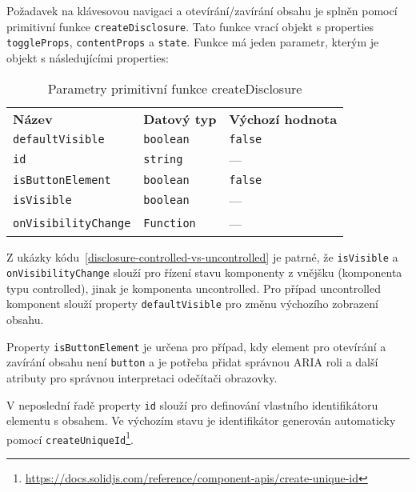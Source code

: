 Požadavek na klávesovou navigaci \hyperref[ofr11]{} a otevírání/zavírání obsahu \hyperref[dfr11]{} je splněn pomocí primitivní funkce \texttt{createDisclosure}.
Tato funkce vrací objekt s properties \texttt{toggleProps}, \texttt{contentProps} a \texttt{state}.
Funkce má jeden parametr, kterým je objekt s následujícími properties:

\begin{table}[ht]
    \begin{ctucolortab}\label{table:disclosure-params}
        \begin{tabularx}{\textwidth}{X X X}
            \bfseries Název             & \bfseries Datový typ & \bfseries Výchozí hodnota \\\Midrule{}
            \texttt{defaultVisible}     & \texttt{boolean}     & \texttt{false}            \\
            \texttt{id}                 & \texttt{string}      & ---                       \\
            \texttt{isButtonElement}    & \texttt{boolean}     & \texttt{false}            \\
            \texttt{isVisible}          & \texttt{boolean}     & ---                       \\
            \texttt{onVisibilityChange} & \texttt{Function}    & ---
        \end{tabularx}
    \end{ctucolortab}
    \caption{Parametry primitivní funkce createDisclosure}
\end{table}

Z ukázky kódu~\ref{disclosure-controlled-vs-uncontrolled} je patrné, že \texttt{isVisible} a \texttt{onVisibilityChange} slouží pro řízení stavu komponenty z vnějšku (komponenta typu controlled), jinak je komponenta uncontrolled.
Pro případ uncontrolled komponent slouží property \texttt{defaultVisible} pro změnu výchozího zobrazení obsahu.

Property \texttt{isButtonElement} je určena pro případ, kdy element pro otevírání a zavírání obsahu není \texttt{button} a je potřeba přidat správnou ARIA roli a další atributy pro správnou interpretaci odečítači obrazovky.

V neposlední řadě property \texttt{id} slouží pro definování vlastního identifikátoru elementu s obsahem.
Ve výchozím stavu je identifikátor generován automaticky pomocí \texttt{createUniqueId}\footnote{\url{https://docs.solidjs.com/reference/component-apis/create-unique-id}}.

